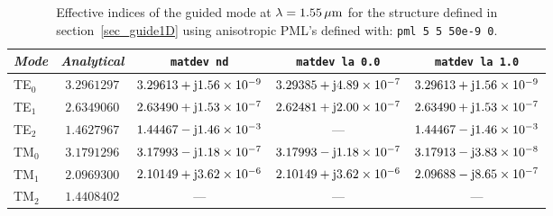 \begin{table}
\centering
{\scriptsize
\begin{tabular}{lcccc}
\hline
\textit{Mode}   & \textit{Analytical}   & \lstinline!matdev nd! & \lstinline!matdev la 0.0! & \lstinline!matdev la 1.0! \\
\hline
TE$_0$ & $3.2961297$ & $3.29613+\mathrm{j} 1.56\times 10^{-9}$ & $3.29385+\mathrm{j} 4.89\times 10^{-7}$ & $3.29613+\mathrm{j} 1.56\times 10^{-9}$ \\
TE$_1$ & $2.6349060$ & $2.63490+\mathrm{j} 1.53\times 10^{-7}$ & $2.62481+\mathrm{j} 2.00\times 10^{-7}$ & $2.63490+\mathrm{j} 1.53\times 10^{-7}$ \\
TE$_2$ & $1.4627967$ & $1.44467-\mathrm{j} 1.46\times 10^{-3}$ & ---         & $1.44467-\mathrm{j} 1.46\times 10^{-3}$ \\
\hline
TM$_0$ & $3.1791296$ & $3.17993-\mathrm{j} 1.18\times 10^{-7}$ & $3.17993-\mathrm{j} 1.18\times 10^{-7}$ & $3.17913-\mathrm{j} 3.83\times 10^{-8}$ \\
TM$_1$ & $2.0969300$ & $2.10149+\mathrm{j} 3.62\times 10^{-6}$ & $2.10149+\mathrm{j} 3.62\times 10^{-6}$ & $2.09688-\mathrm{j} 8.65\times 10^{-7}$ \\
TM$_2$ & $1.4408402$ & ---       & ---       & ---       \\
\hline
\end{tabular}}
\caption{Effective indices of the guided mode at $\lambda=1.55\,\mathrm{\mu m}$ for the structure defined in section~\ref{sec_guide1D} using anisotropic PML's defined with: \lstinline!pml 5 5 50e-9 0!.}
\label{tab_indices_TE_TM_anisotropic}
\end{table}
